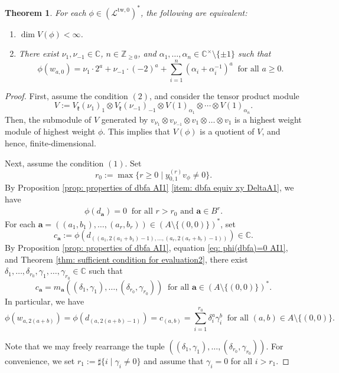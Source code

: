 \documentclass[12pt,a4paper]{amsart}
\newtheorem{thm}{Theorem}[subsection]
\theoremstyle{definition}
\numberwithin{equation}{subsection}
\begin{document}
\begin{thm}\label{thm: classification AI1}
  For each $\phi \in (\mathcal{L}^{\mathrm{tw},0})^*$, the following are equivalent:
  \begin{enumerate}
    \item $\dim V(\phi) < \infty$.
    \item There exist $\nu_1,\nu_{-1} \in \mathbb{C}$, $n \in \mathbb{Z}_{\geq 0}$, and $\alpha_1,\dots,\alpha_n \in \mathbb{C}^\times \setminus \{ \pm 1 \}$ such that
    \[
      \phi(w_{a,0}) = \nu_1 \cdot 2^a + \nu_{-1} \cdot (-2)^a + \sum_{i=1}^n (\alpha_i+\alpha_i^{-1})^a \ \text{ for all } a \geq 0.
    \]
  \end{enumerate}
\end{thm}
\begin{proof}
  First, assume the condition $(2)$, and consider the tensor product module
  \[
    V := V_\mathfrak{k}(\nu_1)_1 \otimes V_\mathfrak{k}(\nu_{-1})_{-1} \otimes V(1)_{\alpha_1} \otimes \cdots \otimes V(1)_{\alpha_n}.
  \]
  Then, the submodule of $V$ generated by $v_{\nu_1} \otimes v_{\nu_{-1}} \otimes v_1 \otimes \dots \otimes v_1$ is a highest weight module of highest weight $\phi$.
  This implies that $V(\phi)$ is a quotient of $V$, and hence, finite-dimensional.

  Next, assume the condition $(1)$.
  Set
  \[
    r_0 := \max\{ r \geq 0 \mid y_{0,1}^{(r)} v_\phi \neq 0 \}.
  \]
  By Proposition \ref{prop: properties of dbfa AI1} \eqref{item: dbfa equiv xy DeltaA1}, we have
  \begin{align}\label{eq: phi(dbfa)=0 AI1}
    \phi(d_\mathbf{a}) = 0 \ \text{ for all } r > r_0 \text{ and } \mathbf{a} \in B^r.
  \end{align}
  For each $\mathbf{a} = ((a_1,b_1),\dots,(a_r,b_r)) \in (A \setminus \{(0,0)\})^*$, set
  \[
    c_\mathbf{a} := \phi(d_{((a_1,2(a_1+b_1)-1),\dots,(a_r,2(a_r+b_r)-1))}) \in \mathbb{C}.
  \]
  By Proposition \ref{prop: properties of dbfa AI1}, equation \eqref{eq: phi(dbfa)=0 AI1}, and Theorem \ref{thm: sufficient condition for evaluation2}, there exist $\delta_1,\dots,\delta_{r_0},\gamma_1,\dots,\gamma_{r_0} \in \mathbb{C}$ such that
  \[
    c_\mathbf{a} = m_\mathbf{a}((\delta_1,\gamma_1),\dots,(\delta_{r_0},\gamma_{r_0})) \ \text{ for all } \mathbf{a} \in (A \setminus \{(0,0)\})^*.
  \]
  In particular, we have
  \[
    \phi(w_{a,2(a+b)}) = \phi(d_{(a,2(a+b)-1)}) = c_{(a,b)} = \sum_{i=1}^{r_0} \delta_i^a \gamma_i^{b} \ \text{ for all } (a,b) \in A \setminus \{(0,0)\}.
  \]

  Note that we may freely rearrange the tuple $((\delta_1,\gamma_1),\dots,(\delta_{r_0},\gamma_{r_0}))$.
  For convenience, we set $r_1 := \sharp \{ i \mid \gamma_i \neq 0 \}$ and assume that $\gamma_i = 0$ for all $i > r_1$.


\end{proof}
\end{document}
